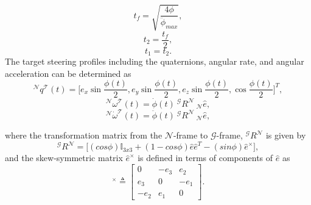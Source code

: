 \documentclass[journal ]{new-aiaa}
\begin{document}
\begin{equation}\label{tfcons_phit}
t_f = \sqrt{\frac{4\phi}{\ddot{\phi}_{max}}},
\end{equation}
\begin{equation}\label{t2cons_phit}
t_2 = \frac{t_f}{2},
\end{equation}
\begin{equation}\label{t1cons_phit}
t_1 = t_2 .
\end{equation}
		The target steering profiles including the quaternions, angular rate, and angular acceleration can be determined as
		\begin{equation}\label{quatT}
		^\mathcal{N}q^\mathcal{T}(t)=\Big[e_x\sin\frac{\phi(t)}{2}, e_y\sin\frac{\phi(t)}{2}, e_z\sin\frac{\phi(t)}{2}, \cos\frac{\phi(t)}{2}\Big]^T,
		\end{equation}
		\begin{equation}\label{omegaT}
		^\mathcal{N}\omega^\mathcal{T}(t)=\dot{\phi}(t)\ ^\mathcal{G}R^\mathcal{N}\ _\mathcal{N}\hat{e},
		\end{equation}
		\begin{equation}\label{alpha_1}
		^\mathcal{N}\dot{\omega}^\mathcal{T}(t)=\ddot{\phi}(t)\ ^\mathcal{G}R^\mathcal{N}\ _\mathcal{N}\hat{e},
		\end{equation}
		
where the transformation matrix from the $\mathcal{N}$-frame to $\mathcal{G}$-frame, $^\mathcal{G}R^\mathcal{N}$ is given by
\begin{equation} \label{G_R_N}
^\mathcal{G}R^\mathcal{N}= \big[(cos\phi)\mathbb{I}_{3x3} + (1 - cos\phi)\hat{e}\hat{e}^T - (sin\phi)\hat{e}^\times \big],
\end{equation}
and the skew-symmetric matrix $\hat{e}^\times$ is defined in terms of components of $\hat{e}$ as
\begin{equation}
	[\hat{e}]^\times\triangleq\begin{bmatrix}
	0 & -e_3 & e_2 \\
	 e_3 & 0& -e_1 \\
	-e_2 & e_1 & 0  
	\end{bmatrix}.
\end{equation}
\end{document}
